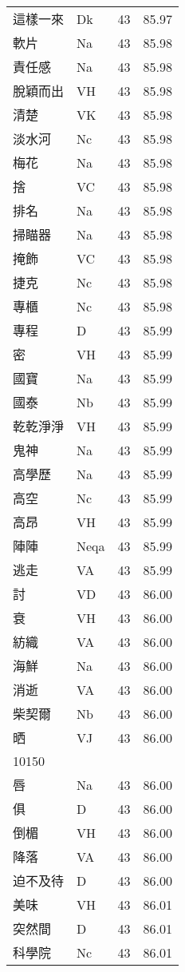 \documentclass[twocolumn]{book}
\begin{document}
\begin{supertabular}{llrr}
這樣一來 & Dk & 43 &  85.97\\
軟片 & Na & 43 &  85.98\\
責任感 & Na & 43 &  85.98\\
脫穎而出 & VH & 43 &  85.98\\
清楚 & VK & 43 &  85.98\\
淡水河 & Nc & 43 &  85.98\\
梅花 & Na & 43 &  85.98\\
捨 & VC & 43 &  85.98\\
排名 & Na & 43 &  85.98\\
掃瞄器 & Na & 43 &  85.98\\
掩飾 & VC & 43 &  85.98\\
捷克 & Nc & 43 &  85.98\\
專櫃 & Nc & 43 &  85.98\\
專程 & D & 43 &  85.99\\
密 & VH & 43 &  85.99\\
國寶 & Na & 43 &  85.99\\
國泰 & Nb & 43 &  85.99\\
乾乾淨淨 & VH & 43 &  85.99\\
鬼神 & Na & 43 &  85.99\\
高學歷 & Na & 43 &  85.99\\
高空 & Nc & 43 &  85.99\\
高昂 & VH & 43 &  85.99\\
陣陣 & Neqa & 43 &  85.99\\
逃走 & VA & 43 &  85.99\\
討 & VD & 43 &  86.00\\
衰 & VH & 43 &  86.00\\
紡織 & VA & 43 &  86.00\\
海鮮 & Na & 43 &  86.00\\
消逝 & VA & 43 &  86.00\\
柴契爾 & Nb & 43 &  86.00\\
晒 & VJ & 43 &  86.00\\
10150\\
唇 & Na & 43 &  86.00\\
俱 & D & 43 &  86.00\\
倒楣 & VH & 43 &  86.00\\
降落 & VA & 43 &  86.00\\
迫不及待 & D & 43 &  86.00\\
美味 & VH & 43 &  86.01\\
突然間 & D & 43 &  86.01\\
科學院 & Nc & 43 &  86.01\\

\end{supertabular}
\end{document}
